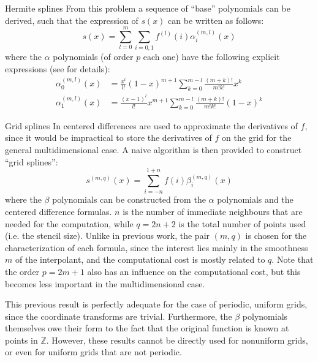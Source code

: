 \documentclass[11pt]{article}
\begin{document}
\begin{small}
\begin{paragraph}{Hermite splines}
        From this problem a sequence of ``base'' polynomials can be derived, such that the expression of $s(x)$
        can be written as follows:
        \begin{equation}
            s(x) = \sum_{l = 0}^m \sum_{i = 0, 1} f^{(l)}(i) \alpha_i^{(m, l)} (x)
        \end{equation}
        where the $\alpha$ polynomials (of order $p$ each one) have the following explicit expressions
        (see \cite{arXiv_splines} for details):
        \begin{align}
            \alpha^{(m, l)}_0 (x) &=
            \frac{x^l}{l!}(1-x)^{m+1} \sum_{k=0}^{m-l} \frac{(m+k)!}{m! k!}x^k \\
            \alpha^{(m, l)}_1 (x) &=
            \frac{(x-1)^l}{l!}x^{m+1} \sum_{k=0}^{m-l} \frac{(m+k)!}{m! k!}(1-x)^k
        \end{align}
    \end{paragraph}
    \begin{paragraph}{Grid splines}
        In \cite{arXiv_splines} centered differences are used to approximate the derivatives of $f$,
        since it would be impractical to store the derivatives of $f$ on the grid for the general
        multidimensional case.
        A naive algorithm is then provided to construct ``grid splines'':
        \begin{equation}
            s^{(m, q)}(x) = \sum_{i = -n}^{1+n} f(i) \beta_i^{(m, q)}(x)
            \label{eq:uniform grid splines}
        \end{equation}
        where the $\beta$ polynomials can be constructed from the $\alpha$ polynomials and the centered
        difference formulas.
        $n$ is the number of immediate neighbours that are needed for the computation, while $q = 2n + 2$ is
        the total number of points used (i.e. the stencil size).
        Unlike in previous work, the pair $(m, q)$ is chosen for the characterization of each formula,
        since the interest lies mainly in the smoothness $m$ of the interpolant,
        and the computational cost is mostly related to $q$.
        Note that the order $p = 2m+1$ also has an influence on the computational cost,
        but this becomes less important in the multidimensional case.

        This previous result is perfectly adequate for the case of periodic, uniform grids, since the coordinate
        transforms are trivial.
        Furthermore, the $\beta$ polynomials themselves owe their form to the fact that the original function is
        known at points in $\mathbb{Z}$.
        However, these results cannot be directly used for nonuniform grids, or even for uniform grids that are
        not periodic.


\end{paragraph}
\end{small}
\end{document}
